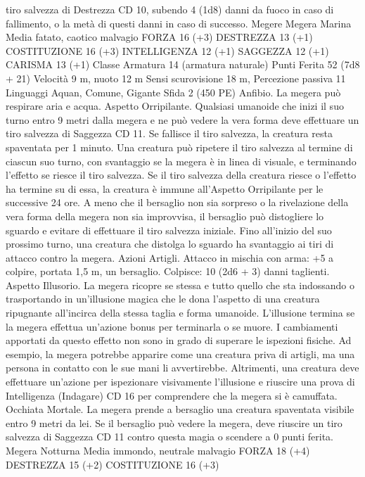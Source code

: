 \begin{multicols}{2}
tiro salvezza di Destrezza CD 10, subendo 4 (1d8) danni da
fuoco in caso di fallimento, o la metà di questi danni in caso di
successo.
Megere
Megera Marina
Media fatato, caotico malvagio
FORZA 16 (+3)
DESTREZZA 13 (+1)
COSTITUZIONE 16 (+3)
INTELLIGENZA 12 (+1)
SAGGEZZA 12 (+1)
CARISMA 13 (+1)
Classe Armatura 14 (armatura naturale)
Punti Ferita 52 (7d8 + 21)
Velocità 9 m, nuoto 12 m
Sensi scurovisione 18 m, Percezione passiva 11
Linguaggi Aquan, Comune, Gigante
Sfida 2 (450 PE)
Anfibio. La megera può respirare aria e acqua.
Aspetto Orripilante. Qualsiasi umanoide che inizi il suo turno
entro 9 metri dalla megera e ne può vedere la vera forma deve
effettuare un tiro salvezza di Saggezza CD 11. Se fallisce il tiro
salvezza, la creatura resta spaventata per 1 minuto. Una creatura
può ripetere il tiro salvezza al termine di ciascun suo turno, con
svantaggio se la megera è in linea di visuale, e terminando
l’effetto se riesce il tiro salvezza. Se il tiro salvezza della creatura
riesce o l’effetto ha termine su di essa, la creatura è immune
all’Aspetto Orripilante per le successive 24 ore.
A meno che il bersaglio non sia sorpreso o la rivelazione della
vera forma della megera non sia improvvisa, il bersaglio può
distogliere lo sguardo e evitare di effettuare il tiro salvezza
iniziale. Fino all’inizio del suo prossimo turno, una creatura che
distolga lo sguardo ha svantaggio ai tiri di attacco contro la
megera.
Azioni
Artigli. Attacco in mischia con arma: +5 a colpire, portata 1,5 m,
un bersaglio.
Colpisce: 10 (2d6 + 3) danni taglienti.
Aspetto Illusorio. La megera ricopre se stessa e tutto quello che
sta indossando o trasportando in un’illusione magica che le dona
l’aspetto di una creatura ripugnante all’incirca della stessa taglia
e forma umanoide. L’illusione termina se la megera effettua
un’azione bonus per terminarla o se muore.
I cambiamenti apportati da questo effetto non sono in grado di
superare le ispezioni fisiche. Ad esempio, la megera potrebbe
apparire come una creatura priva di artigli, ma una persona in
contatto con le sue mani li avvertirebbe. Altrimenti, una creatura
deve effettuare un’azione per ispezionare visivamente l’illusione
e riuscire una prova di Intelligenza (Indagare) CD 16 per
comprendere che la megera si è camuffata.
Occhiata Mortale. La megera prende a bersaglio una creatura
spaventata visibile entro 9 metri da lei. Se il bersaglio può vedere
la megera, deve riuscire un tiro salvezza di Saggezza CD 11
contro questa magia o scendere a 0 punti ferita.
Megera Notturna
Media immondo, neutrale malvagio
FORZA 18 (+4)
DESTREZZA 15 (+2)
COSTITUZIONE 16 (+3)

\end{multicols}
